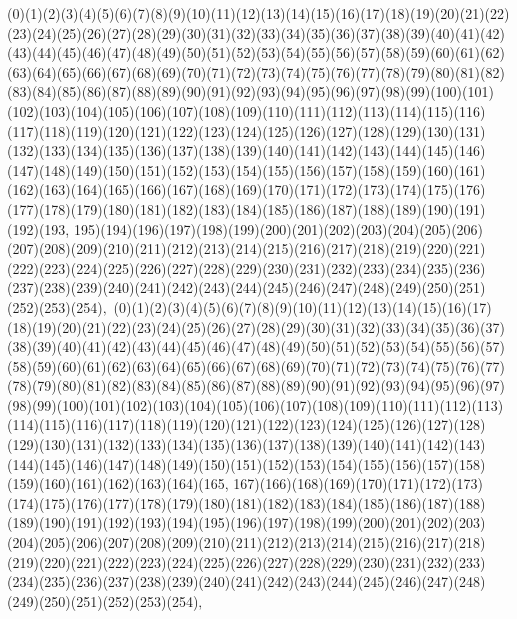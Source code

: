 \documentclass[12pt]{article}
\begin{document}
{(0)(1)(2)(3)(4)(5)(6)(7)(8)(9)(10)(11)(12)(13)(14)(15)(16)(17)(18)(19)(20)(21)(22)(23)(24)(25)(26)(27)(28)(29)(30)(31)(32)(33)(34)(35)(36)(37)(38)(39)(40)(41)(42)(43)(44)(45)(46)(47)(48)(49)(50)(51)(52)(53)(54)(55)(56)(57)(58)(59)(60)(61)(62)(63)(64)(65)(66)(67)(68)(69)(70)(71)(72)(73)(74)(75)(76)(77)(78)(79)(80)(81)(82)(83)(84)(85)(86)(87)(88)(89)(90)(91)(92)(93)(94)(95)(96)(97)(98)(99)(100)(101)(102)(103)(104)(105)(106)(107)(108)(109)(110)(111)(112)(113)(114)(115)(116)(117)(118)(119)(120)(121)(122)(123)(124)(125)(126)(127)(128)(129)(130)(131)(132)(133)(134)(135)(136)(137)(138)(139)(140)(141)(142)(143)(144)(145)(146)(147)(148)(149)(150)(151)(152)(153)(154)(155)(156)(157)(158)(159)(160)(161)(162)(163)(164)(165)(166)(167)(168)(169)(170)(171)(172)(173)(174)(175)(176)(177)(178)(179)(180)(181)(182)(183)(184)(185)(186)(187)(188)(189)(190)(191)(192)(193, 195)(194)(196)(197)(198)(199)(200)(201)(202)(203)(204)(205)(206)(207)(208)(209)(210)(211)(212)(213)(214)(215)(216)(217)(218)(219)(220)(221)(222)(223)(224)(225)(226)(227)(228)(229)(230)(231)(232)(233)(234)(235)(236)(237)(238)(239)(240)(241)(242)(243)(244)(245)(246)(247)(248)(249)(250)(251)(252)(253)(254)$
, 
$
(0)(1)(2)(3)(4)(5)(6)(7)(8)(9)(10)(11)(12)(13)(14)(15)(16)(17)(18)(19)(20)(21)(22)(23)(24)(25)(26)(27)(28)(29)(30)(31)(32)(33)(34)(35)(36)(37)(38)(39)(40)(41)(42)(43)(44)(45)(46)(47)(48)(49)(50)(51)(52)(53)(54)(55)(56)(57)(58)(59)(60)(61)(62)(63)(64)(65)(66)(67)(68)(69)(70)(71)(72)(73)(74)(75)(76)(77)(78)(79)(80)(81)(82)(83)(84)(85)(86)(87)(88)(89)(90)(91)(92)(93)(94)(95)(96)(97)(98)(99)(100)(101)(102)(103)(104)(105)(106)(107)(108)(109)(110)(111)(112)(113)(114)(115)(116)(117)(118)(119)(120)(121)(122)(123)(124)(125)(126)(127)(128)(129)(130)(131)(132)(133)(134)(135)(136)(137)(138)(139)(140)(141)(142)(143)(144)(145)(146)(147)(148)(149)(150)(151)(152)(153)(154)(155)(156)(157)(158)(159)(160)(161)(162)(163)(164)(165, 167)(166)(168)(169)(170)(171)(172)(173)(174)(175)(176)(177)(178)(179)(180)(181)(182)(183)(184)(185)(186)(187)(188)(189)(190)(191)(192)(193)(194)(195)(196)(197)(198)(199)(200)(201)(202)(203)(204)(205)(206)(207)(208)(209)(210)(211)(212)(213)(214)(215)(216)(217)(218)(219)(220)(221)(222)(223)(224)(225)(226)(227)(228)(229)(230)(231)(232)(233)(234)(235)(236)(237)(238)(239)(240)(241)(242)(243)(244)(245)(246)(247)(248)(249)(250)(251)(252)(253)(254)$
, 
$
}
\end{document}
